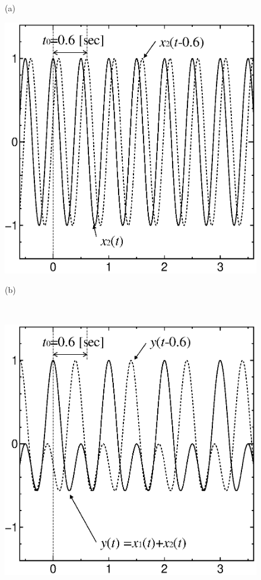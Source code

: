 \begin{figure}[H]
\begin{center}
\begin{minipage}{.35\textwidth}
\begin{center}
(a)
\end{center}
\end{minipage}
\begin{minipage}{.35\textwidth}
\begin{center}
\includegraphics[width=.98\textwidth]{fig/zu-6-7-b.eps}

(b)
\end{center}
\end{minipage}\\[.5\baselineskip]
\begin{minipage}{.35\textwidth}
\begin{center}
\includegraphics[width=.98\textwidth]{fig/zu-6-7-c.eps}


\end{center}
\end{minipage}
\end{center}
\end{figure}
